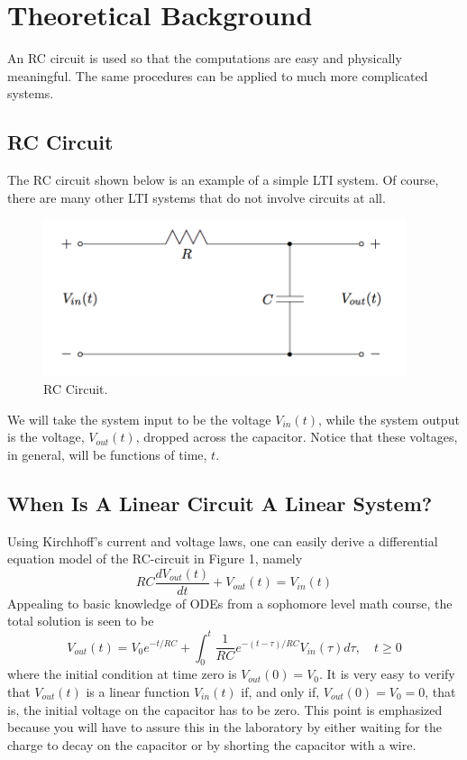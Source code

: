\documentclass [utf8] {article}
\begin{document}
\section{Theoretical Background}
{
    An RC circuit is used so that the computations are easy and physically meaningful. The same procedures can be applied to much more complicated systems.
\subsection{RC Circuit}
{
    The RC circuit shown below is an example of a simple LTI system. Of course, there are many other LTI systems that do not involve circuits at all.
    \begin{figure}[H]
        \begin{small}
            \begin{center}
                \includegraphics[width=0.95\textwidth]{figures/Figure1.png}
            \end{center}
            \caption{RC Circuit.}
            \label{fig:fig1}
        \end{small}
    \end{figure}

    We will take the system input to be the voltage $V_{in}(t)$, while the system output is the voltage, $V_{out}(t)$, dropped across the capacitor. Notice that these voltages, in general, will be functions of time, $t$.
}
\subsection{When Is A Linear Circuit A Linear System?}
{
    Using Kirchhoff's current and voltage laws, one can easily derive a differential equation model of the RC-circuit in Figure 1, namely
    \[R C \frac{d V_{o u t}(t)}{d t}+V_{o u t}(t)=V_{i n}(t) \tag{1}\]
    Appealing to basic knowledge of ODEs from a sophomore level math course, the total solution is seen to be
    \[V_{o u t}(t)=V_{0} e^{-t / R C}+\int_{0}^{t} \frac{1}{R C} e^{-(t-\tau) / R C} V_{i n}(\tau) d \tau, \quad t \geq 0 \tag{2}\]
    where the initial condition at time zero is $V_{out}(0) = V_0$. It is very easy to verify that $V_{out}(t)$ is a linear function $V_{in}(t)$ if, and only if, $V_{out}(0) = V_0 = 0$, that is, the initial voltage on the capacitor has to be zero. This point is emphasized because you will have to assure this in the laboratory by either waiting for the charge to decay on the capacitor or by shorting the capacitor with a wire.
}
}
\end{document}
